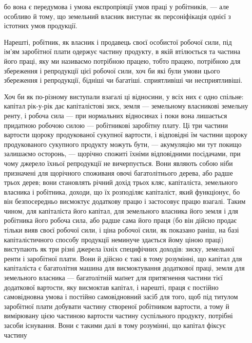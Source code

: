 \parcont{}  %
бо вона є передумова і умова експропріяції умов праці у робітників, — але
особливо й тому, що земельний власник виступає як персоніфікація однієї з
істотних умов продукції.

Нарешті, робітник, як власник і продавець своєї особистої робочої сили,
під ім’ям заробітної плати одержує частину продукту, в якій втілюється та
частина його праці, яку ми називаємо потрібною працею, тобто працею, потрібною
для збереження і репродукції цієї робочої сили, хоч би які були умови
цього збереження і репродукції, бідніші чи багатіші. сприятливіші чи несприятливіші.

Хоч би як по-різному виступали взагалі ці відносини, у всіх них є одно
спільне: капітал рік-у-рік дає капіталістові зиск, земля — земельному власникові
земельну ренту, і робоча сила — при нормальних відносинах і поки
вона лишається придатною робочою силою — робітникові заробітну плату.
Ці три частини вартости щороку продукованої сукупної вартости, і відповідні
їм частини щороку продукованого сукупного продукту можуть бути, — акумуляцію
ми тут покищо залишаємо осторонь, — щорічно спожиті їхніми відповідними
посідачами, при чому джерело їхньої репродукції не вичерпується. Вони являють
собою ніби призначені для щорічного споживаня овочі багатолітнього дерева, або
радше трьох дерев; вони становлять річний дохід трьох кляс, капіталіста, земельного
власника і робітника, доходи, що їх розподіляє капіталіст, який функціонує,
бо він безпосередньо висмоктує додаткову працю і застосовує працю взагалі.
Таким чином, для капіталіста його капітал, для земельного власника його земля
і для робітника його робоча сила, або радше сама його праця (бо він дійсно
продає тільки вияв своєї робочої сили, і ціна робочої сили, як показано раніш,
на базі капіталістичного способу продукції неминуче здається йому ціною праці)
виступають як три різні джерела їхніх специфічних доходів: зиску, земельної
ренти і заробітної плати. Вони й дійсно є такі в тому розумінні, що капітал
для капіталіста є багатолітня машина для висмоктування додаткової праці,
земля для земельного власника — багатолітній маґнет для притягнення частини
тієї додаткової вартости, яку висмоктав капітал, і нарешті, праця є постійно
самовідновна умова і постійно самовідновний засіб для того, щоб під титулом
заробітної плати добувати частину створеної робітником вартости, а тому й вимірювану
цією частиною вартости частину суспільного продукту, потрібні засоби
існування. Вони є такими далі в тому розумінні, що капітал фіксує частину
